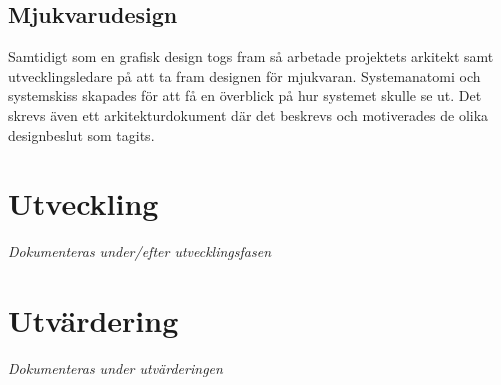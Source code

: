 \subsection{Mjukvarudesign}
Samtidigt som en grafisk design togs fram så arbetade projektets arkitekt samt utvecklingsledare på att ta fram designen för mjukvaran. Systemanatomi och systemskiss skapades för att få en överblick på hur systemet skulle se ut. Det skrevs även ett arkitekturdokument där det beskrevs och motiverades de olika designbeslut som tagits.

\section{Utveckling}
\textit{Dokumenteras under/efter utvecklingsfasen}

\section{Utvärdering}
\textit{Dokumenteras under utvärderingen}
